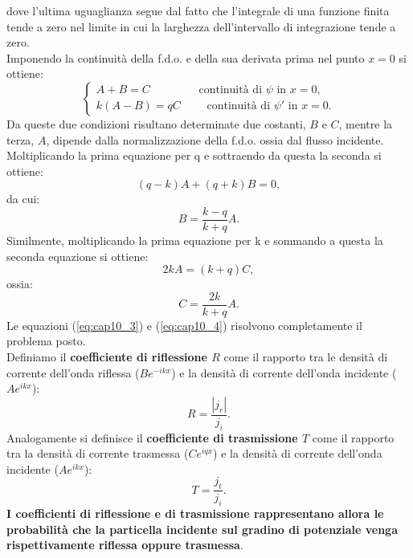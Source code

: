 dove l'ultima uguaglianza segue dal fatto che l'integrale di una funzione finita tende a zero nel limite in cui la larghezza dell'intervallo di integrazione tende a zero.\\
Imponendo la continuità della f.d.o. e della sua derivata prima nel punto $x=0$ si ottiene:
\begin{equation}
\begin{cases}
A+B=C \quad \qquad \quad \textrm{ continuità di }\psi\textrm{ in }x=0,\\
k\left(A-B \right) =qC\qquad \textrm{ continuità di }\psi '\textrm{ in }x=0.
\end{cases}
\end{equation}
Da queste due condizioni risultano determinate due costanti, $B$ e $C$, mentre la terza, $A$, dipende dalla normalizzazione della f.d.o. ossia dal flusso incidente.\\
Moltiplicando la prima equazione per q e sottraendo da questa la seconda si ottiene:
\begin{equation}
\left( q-k \right) A + \left( q+k \right)B=0,
\end{equation}
da cui:
\begin{equation}
B= \frac{k-q}{k+q}A.
\label{eq:cap10_3}
\end{equation}
Similmente, moltiplicando la prima equazione per k e sommando a questa la seconda equazione si ottiene:
\begin{equation}
2kA=\left( k+q \right)C,
\end{equation}
ossia:
\begin{equation}
C=\frac{2k}{k+q}A.
\label{eq:cap10_4}
\end{equation}
Le equazioni (\ref{eq:cap10_3}) e (\ref{eq:cap10_4}) risolvono completamente il problema posto.\\
Definiamo il \textbf{coefficiente di riflessione $R$} come il rapporto tra le densità di corrente dell'onda riflessa ($\displaystyle{Be^{-ikx}}$) e la densità di corrente dell'onda incidente ($\displaystyle{Ae^{ikx}}$):
\begin{equation}
R=\frac{|j_r|}{j_i}.
\end{equation}
Analogamente si definisce il \textbf{coefficiente di trasmissione $T$} come il rapporto tra la densità di corrente trasmessa ($\displaystyle{Ce^{iqx}}$) e la densità di corrente dell'onda incidente ($\displaystyle{Ae^{ikx}}$):
\begin{equation}
T=\frac{j_t}{j_i}.
\end{equation}
\textbf{I coefficienti di riflessione e di trasmissione rappresentano allora le probabilità che la particella incidente sul gradino di potenziale venga rispettivamente riflessa oppure trasmessa}.\\
